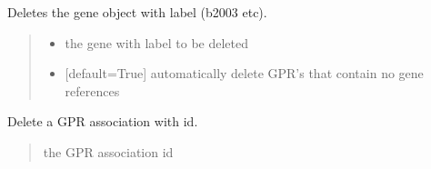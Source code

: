 \documentclass[letterpaper,12pt,english]{sphinxmanual}
\begin{document}
\begin{fulllineitems}
\begin{fulllineitems}
\label{\detokenize{api/core:cbmpy.CBModel.Model.deleteGeneByLabel}}
\pysigstartsignatures
\pysiglinewithargsret
{}
{\sphinxparamcomma {}}
{}
\pysigstopsignatures
\sphinxAtStartPar
Deletes the gene object with label (b2003 etc).
\begin{quote}\begin{description}
\begin{itemize}
\item {} 
\sphinxAtStartPar
{} \textendash{} the gene with label to be deleted

\item {} 
\sphinxAtStartPar
{} \textendash{} {[}default=True{]} automatically delete GPR’s that contain no gene references

\end{itemize}

\end{description}\end{quote}

\end{fulllineitems}


\begin{fulllineitems}
\label{\detokenize{api/core:cbmpy.CBModel.Model.deleteGPRAssociation}}
\pysigstartsignatures
\pysiglinewithargsret
{}
{}
{}
\pysigstopsignatures
\sphinxAtStartPar
Delete a GPR association with id.
\begin{quote}\begin{description}
\sphinxAtStartPar
{} \textendash{} the GPR association id

\end{description}\end{quote}

\end{fulllineitems}



\end{fulllineitems}
\end{document}
